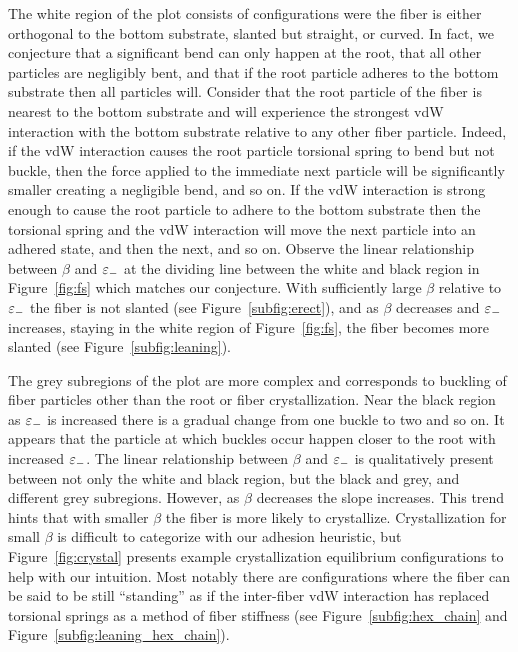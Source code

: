 {The white region of the plot consists of configurations were the fiber is either orthogonal to the bottom substrate, slanted but straight, or curved. In fact, we conjecture that a significant bend can only happen at the root, that all other particles are negligibly bent, and that if the root particle adheres to the bottom substrate then all particles will. Consider that the root particle of the fiber is nearest to the bottom substrate and will experience the strongest vdW interaction with the bottom substrate relative to any other fiber particle. Indeed, if the vdW interaction causes the root particle torsional spring to bend but not buckle, then the force applied to the immediate next particle will be significantly smaller creating a negligible bend, and so on. If the vdW interaction is strong enough to cause the root particle to adhere to the bottom substrate then the torsional spring and the vdW interaction will move the next particle into an adhered state, and then the next, and so on. Observe the linear relationship between $\beta$ and $\varepsilon_-$ at the dividing line between the white and black region in Figure~\ref{fig:fs} which matches our conjecture. With sufficiently large $\beta$ relative to $\varepsilon_-$ the fiber is not slanted (see Figure~\ref{subfig:erect}), and as $\beta$ decreases and $\varepsilon_-$ increases, staying in the white region of Figure~\ref{fig:fs}, the fiber becomes more slanted (see Figure~\ref{subfig:leaning}).

The grey subregions of the plot are more complex and corresponds to buckling of fiber particles other than the root or fiber crystallization. Near the black region as $\varepsilon_-$ is increased there is a gradual change from one buckle to two and so on. It appears that the particle at which buckles occur happen closer to the root with increased $\varepsilon_-$. The linear relationship between $\beta$ and $\varepsilon_-$ is qualitatively present between not only the white and black region, but the black and grey, and different grey subregions. However, as $\beta$ decreases the slope increases. This trend hints that with smaller $\beta$ the fiber is more likely to crystallize. Crystallization for small $\beta$ is difficult to categorize with our adhesion heuristic, but Figure~\ref{fig:crystal} presents example crystallization equilibrium configurations to help with our intuition. Most notably there are configurations where the fiber can be said to be still ``standing'' as if the inter-fiber vdW interaction has replaced torsional springs as a method of fiber stiffness (see Figure~\ref{subfig:hex_chain} and Figure~\ref{subfig:leaning_hex_chain}).

}
